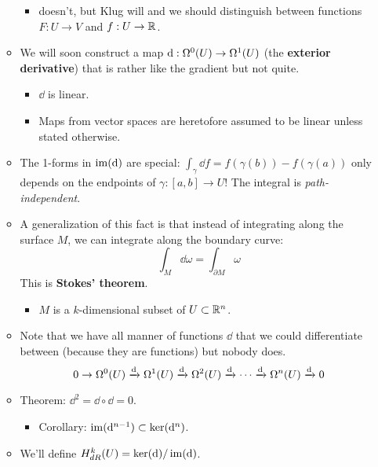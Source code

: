 \documentclass[../notes.tex]{subfiles}
\begin{document}
\begin{itemize}
\begin{itemize}
        \begin{itemize}
            \item \textcite{bib:DifferentialForms} doesn't, but Klug will and we should distinguish between functions $F:U\to V$ and $f:U\to\R$.
        \end{itemize}
        \item We will soon construct a map $\dd:\ome[0]{U}\to\ome[1]{U}$ (the \textbf{exterior derivative}) that is rather like the gradient but not quite.
        \begin{itemize}
            \item $\dd$ is linear.
            \item Maps from vector spaces are heretofore assumed to be linear unless stated otherwise.
        \end{itemize}
        \item The 1-forms in $\im(\dd)$ are special: $\int_\gamma\dd{f}=f(\gamma(b))-f(\gamma(a))$ only depends on the endpoints of $\gamma:[a,b]\to U$! The integral is \emph{path-independent}.
        \item A generalization of this fact is that instead of integrating along the surface $M$, we can integrate along the boundary curve:
        \begin{equation*}
            \int_M\dd{\omega} = \int_{\partial M}\omega
        \end{equation*}
        This is \textbf{Stokes' theorem}.
        \begin{itemize}
            \item $M$ is a $k$-dimensional subset of $U\subset\R^n$.
        \end{itemize}
        \item Note that we have all manner of functions $\dd$ that we could differentiate between (because they are functions) but nobody does.
        \begin{equation*}
            0 \rightarrow \ome[0]{U}
            \xrightarrow{\dd} \ome[1]{U}
            \xrightarrow{\dd} \ome[2]{U}
            \xrightarrow{\dd} \cdots
            \xrightarrow{\dd} \ome[n]{U}
            \xrightarrow{\dd} 0
        \end{equation*}
        \item Theorem: $\dd^2=\dd\circ\dd=0$.
        \begin{itemize}
            \item Corollary: $\im(\dd^{n-1})\subset\ker(\dd^n)$.
        \end{itemize}
        \item We'll define $H^k_{dR}(U)=\ker(\dd)/\im(\dd)$.

\end{itemize}
\end{itemize}
\end{document}
